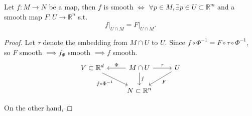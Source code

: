 \begin{lemma}
	Let $f: M\to N$ be a map,
	then $f$ is smooth $\iff$ $\forall p\in M,
	\exists p\in U \subset \mathbb{R}^{m}$ and
	a smooth map $F: U\to \mathbb{R}^{n}$ s.t.
	\[
	f\big|_{U\cap M} = F\big|_{U\cap M}.
	\]
\end{lemma}
\begin{proof}[Proof]
    Let $\tau$ denote the embedding from $M\cap U$ to $U$.
	Since $f\circ \Phi^{-1} = F\circ \tau\circ \Phi^{-1}$,
	so $F$ smooth $ \implies f_\Phi$ smooth $ \implies f$ smooth.
	\begin{equation*}
	\begin{tikzcd}
		V \subset \mathbb{R}^{d}\drar["f\circ \Phi^{-1}"']
		& M\cap U\rar["\tau"]\lar["\Phi"']\dar["f"]
								& U\dlar["F"]\\
		& N \subset \mathbb{R}^{n}
	\end{tikzcd}
	\end{equation*}
	

	On the other hand,
\end{proof}
